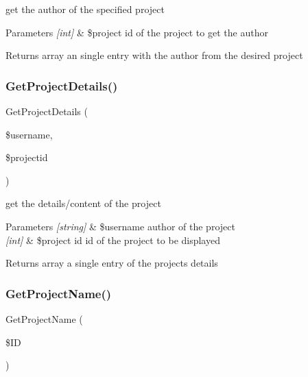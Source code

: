 get the author of the specified project 


\begin{DoxyParams}{Parameters}
{\em \mbox{[}int\mbox{]}} & \$project id of the project to get the author\\
\hline
\end{DoxyParams}
\begin{DoxyReturn}{Returns}
array an single entry with the author from the desired project 
\end{DoxyReturn}
\mbox{\label{class_project_d_a_o_aef077c373665972101668ce915526786}} 
\subsubsection{\texorpdfstring{Get\+Project\+Details()}{GetProjectDetails()}}
{\footnotesize\ttfamily Get\+Project\+Details (\begin{DoxyParamCaption}\item[{}]{\$username,  }\item[{}]{\$projectid }\end{DoxyParamCaption})}



get the details/content of the project 


\begin{DoxyParams}{Parameters}
{\em \mbox{[}string\mbox{]}} & \$username author of the project \\
\hline
{\em \mbox{[}int\mbox{]}} & \$project id id of the project to be displayed\\
\hline
\end{DoxyParams}
\begin{DoxyReturn}{Returns}
array a single entry of the project\textquotesingle{}s details 
\end{DoxyReturn}
\mbox{\label{class_project_d_a_o_a483563c27167fa2cbc95cc537527e994}} 
\subsubsection{\texorpdfstring{Get\+Project\+Name()}{GetProjectName()}}
{\footnotesize\ttfamily Get\+Project\+Name (\begin{DoxyParamCaption}\item[{}]{\$\+ID }\end{DoxyParamCaption})}



